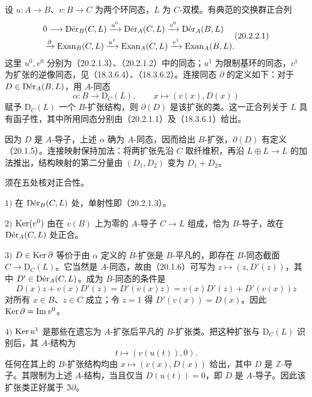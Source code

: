 设 $u:A\to B$、$v:B\to C$ 为两个环同态，$L$ 为 $C$-双模。有典范的交换群正合列
\begin{equation}
\begin{aligned}
 &0\longrightarrow\Der_B(C,L)\xrightarrow{u^0}\Der_A(C,L)\xrightarrow{v^0}\Der_A(B,L)\\
 &\qquad\xrightarrow{\partial}\Exan_B(C,L)\xrightarrow{u^1}\Exan_A(C,L)
 \xrightarrow{v^1}\Exan_A(B,L).
\end{aligned}
\tag{20.2.2.1}
\end{equation}
这里 $u^0,v^0$ 分别为（20.2.1.3）、（20.2.1.2）中的同态；$u^1$ 为限制基环的同态，$v^1$ 为扩张的逆像同态，见（18.3.6.4）、（18.3.6.2）。连接同态 $\partial$ 的定义如下：对于 $D\in\Der_A(B,L)$，用 $A$-同态
\[
 \alpha:B\longrightarrow\mathrm D_C(L),\qquad
 x\longmapsto(v(x),D(x))
\]
赋予 $\mathrm D_C(L)$ 一个 $B$-扩张结构，则 $\partial(D)$ 是该扩张的类。这一正合列关于 $L$ 具有函子性，其中所用同态分别由（20.2.1.1）及（18.3.6.1）给出。

因为 $D$ 是 $A$-导子，上述 $\alpha$ 确为 $A$-同态，因而给出 $B$-扩张，$\partial(D)$ 有定义（20.1.5）。连接映射保持加法：将两扩张先沿 $C$ 取纤维积，再沿 $L\oplus L\to L$ 的加法推出，结构映射的第二分量由 $(D_1,D_2)$ 变为 $D_1+D_2$。

须在五处核对正合性。

$1)$ 在 $\Der_B(C,L)$ 处，单射性即（20.2.1.3）。

$2)$ $\Ker(v^0)$ 由在 $v(B)$ 上为零的 $A$-导子 $C\to L$ 组成，恰为 $B$-导子，故在 $\Der_A(C,L)$ 处正合。

$3)$ $D\in\Ker\partial$ 等价于由 $\alpha$ 定义的 $B$-扩张是 $B$-平凡的，即存在 $B$-同态截面 $C\to\mathrm D_C(L)$。它当然是 $A$-同态，故由（20.1.6）可写为 $z\mapsto(z,D'(z))$，其中 $D'\in\Der_A(C,L)$。成为 $B$-同态的条件是
\[
 D(x)z+v(x)D'(z)=D'(v(x)z)
 =v(x)D'(z)+D'(v(x))z
\]
对所有 $x\in B$、$z\in C$ 成立；令 $z=1$ 得 $D'(v(x))=D(x)$。因此 $\Ker\partial=\Im v^0$。

$4)$ $\Ker u^1$ 是那些在遗忘为 $A$-扩张后平凡的 $B$-扩张类。把这种扩张与 $\mathrm D_C(L)$ 识别后，其 $A$-结构为
\[
 t\longmapsto(v(u(t)),0).
\]
任何在其上的 $B$-扩张结构均由 $x\mapsto(v(x),D(x))$ 给出，其中 $D$ 是 $\mathbb Z$-导子。其限制为上述 $A$-结构，当且仅当 $D(u(t))=0$，即 $D$ 是 $A$-导子。因此该扩张类正好属于 $\Im\partial$。

